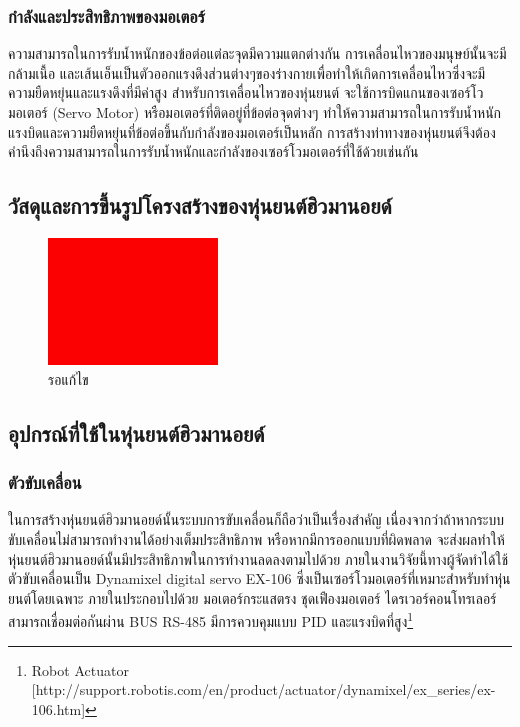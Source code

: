 \subsubsection{กำลังและประสิทธิภาพของมอเตอร์}
ความสามารถในการรับน้ำหนักของข้อต่อแต่ละจุดมีความแตกต่างกัน การเคลื่อนไหวของมนุษย์นั้นจะมีกล้ามเนื้อ
และเส้นเอ็นเป็นตัวออกแรงดึงส่วนต่างๆของร่างกายเพื่อทำให้เกิดการเคลื่อนไหวซึ่งจะมีความยืดหยุ่นและแรงดึงที่มีค่าสูง
สำหรับการเคลื่อนไหวของหุ่นยนต์ จะใช้การบิดแกนของเซอร์โวมอเตอร์ (Servo Motor) หรือมอเตอร์ที่ติดอยู่ที่ข้อต่อจุดต่างๆ
ทำให้ความสามารถในการรับน้ำหนัก แรงบิดและความยืดหยุ่นที่ข้อต่อขึ้นกับกำลังของมอเตอร์เป็นหลัก
การสร้างท่าทางของหุ่นยนต์จึงต้องคำนึงถึงความสามารถในการรับน้ำหนักและกำลังของเซอร์โวมอเตอร์ที่ใช้ด้วยเช่นกัน

\subsection{วัสดุและการขึ้นรูปโครงสร้างของหุ่นยนต์ฮิวมานอยด์}
\begin{figure}[ht]
    \centering
    \includegraphics[width=0.40\textwidth]{chapter2/images/toedit.jpg}
    \caption{รอแก้ไข}
    \label{fig:toedit}
\end{figure}

\subsection{อุปกรณ์ที่ใช้ในหุ่นยนต์ฮิวมานอยด์}

\subsubsection{ตัวขับเคลื่อน}
ในการสร้างหุ่นยนต์ฮิวมานอยด์นั้นระบบการขับเคลื่อนก็ถือว่าเป็นเรื่องสำคัญ เนื่องจากว่าถ้าหากระบบขับเคลื่อนไม่สามารถทำงานได้อย่างเต็มประสิทธิภาพ
หรือหากมีการออกแบบที่ผิดพลาด จะส่งผลทำให้หุ่นยนต์ฮิวมานอยด์นั้นมีประสิทธิภาพในการทำงานลดลงตามไปด้วย ภายในงานวิจัยนี้ทางผู้จัดทำได้ใช้ตัวขับเคลื่อนเป็น
Dynamixel digital servo EX-106 ซึ่งเป็นเซอร์โวมอเตอร์ที่เหมาะสำหรับทำหุ่นยนต์โดยเฉพาะ ภายในประกอบไปด้วย มอเตอร์กระแสตรง ชุดเฟืองมอเตอร์
ไดรเวอร์คอนโทรเลอร์ สามารถเชื่อมต่อกันผ่าน BUS RS-485 มีการควบคุมแบบ PID และแรงบิดที่สูง\footnote{ Robot Actuator [http://support.robotis.com/en/product/actuator/dynamixel/ex\_series/ex-106.htm] }

